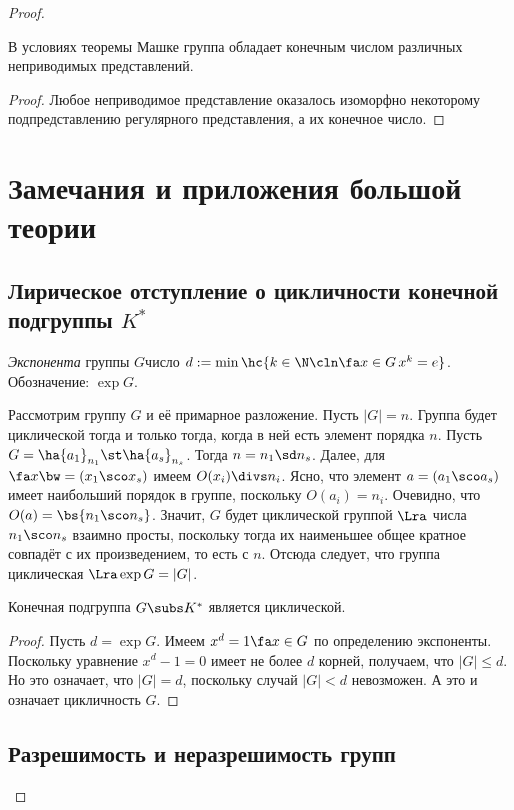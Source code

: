 \documentclass[a4paper]{article}
\begin{document}
\begin{proof}
\begin{imp}
В условиях теоремы Машке группа обладает конечным числом различных неприводимых представлений.
\end{imp}
\begin{proof}
Любое неприводимое представление оказалось изоморфно некоторому  подпредставлению регулярного представления,
а их конечное число.
\end{proof}

\section{Замечания и приложения большой теории}

\subsection{Лирическое отступление о цикличности конечной подгруппы $K^*$}

\begin{df}
\emph{Экспонента} группы $G$\т число $d := \min \hc{k \in \N\cln \fa x \in G\, x^k = e}$. Обозначение: $\exp G$.
\end{df}

Рассмотрим группу $G$ и её примарное разложение. Пусть $|G| = n$. Группа будет циклической тогда и только
тогда, когда в ней есть элемент порядка $n$. Пусть $G = \ha{a_1}_{n_1}\st \ha{a_s}_{n_s}$. Тогда $n = n_1\sd
n_s$. Далее, для $\fa x \bw= (x_1\sco x_s)$ имеем $O(x_i) \divs n_i$. Ясно, что элемент $a = (a_1\sco a_s)$ имеет
наибольший порядок в группе, поскольку $O(a_i) = n_i$. Очевидно, что $O(a) = \bs{n_1\sco n_s}$. Значит, $G$
будет циклической группой $\Lra$ числа $n_1\sco n_s$ взаимно просты, поскольку тогда их наименьшее общее
кратное совпадёт с их произведением, то есть с $n$. Отсюда следует, что группа циклическая $\Lra \exp G = |G|$.

\begin{theorem}
Конечная подгруппа $G \subs K^*$ является циклической.
\end{theorem}
\begin{proof}
Пусть $d = \exp G$. Имеем $x^d = 1 \fa x \in G$ по определению экспоненты.  Поскольку уравнение $x^d-1=0$
имеет не более $d$ корней, получаем, что $|G| \le d$. Но это означает, что $|G| = d$, поскольку случай $|G| <
d$ невозможен. А это и означает цикличность $G$.
\end{proof}

\subsection{Разрешимость и неразрешимость групп}


\end{proof}
\end{document}
